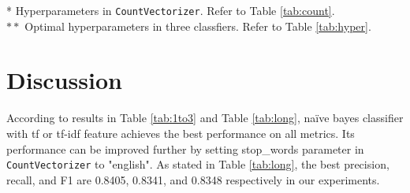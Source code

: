 \documentclass[12pt]{article}
\begin{document}
\begin{flushleft}
\footnotesize
 * Hyperparameters in \texttt{CountVectorizer}. Refer to Table \ref{tab:count}.\\
$**$ Optimal hyperparameters in three classfiers. Refer to Table \ref{tab:hyper}.
\end{flushleft}
\section{Discussion}
According to results in Table \ref{tab:1to3} and Table \ref{tab:long}, na\"ive bayes classifier with tf or tf-idf feature achieves the best performance on all metrics. Its performance can be improved further by setting stop\_words parameter in \texttt{CountVectorizer} to "english". As stated in Table \ref{tab:long}, the best precision, recall, and F1 are 0.8405, 0.8341, and 0.8348 respectively in our experiments. 
\end{document}

